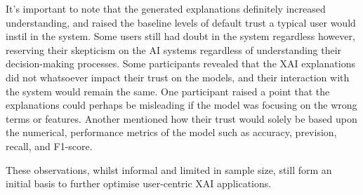 \noindent It's important to note that the generated explanations definitely increased understanding, and raised the baseline levels of default trust a typical user would instil in the system. Some users still had doubt in the system regardless however, reserving their skepticism on the AI systems regardless of understanding their decision-making processes. Some participants revealed that the XAI explanations did not whatsoever impact their trust on the models, and their interaction with the system would remain the same. One participant raised a point that the explanations could perhaps be misleading if the model was focusing on the wrong terms or features. Another mentioned how their trust would solely be based upon the numerical, performance metrics of the model such as accuracy, prevision, recall, and F1-score.\newline

\noindent These observations, whilst informal and limited in sample size, still form an initial basis to further optimise user-centric XAI applications.
